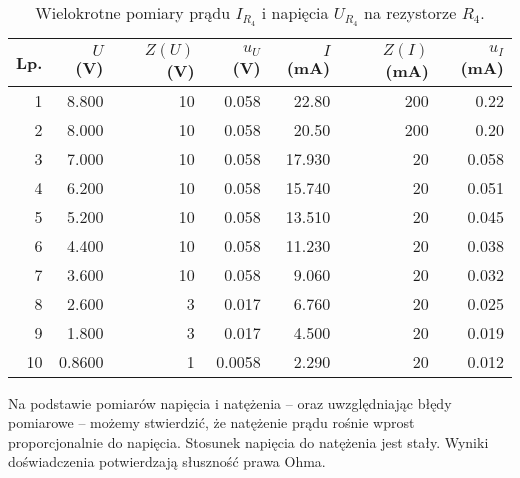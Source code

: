\documentclass[a4paper]{article}
\newlength{\du}
\begin{document}
\begin{table}
\centering
\begin{tabular}{rrrrrrr}
\toprule
Lp. &  $U$ (V) &  $Z(U)$ (V) &  $u_U$ (V) &  $I$ (mA) &  $Z(I)$ (mA) &  $u_I$ (mA) \\
\midrule
1 &          8.800  &                10 &                 0.058  &             22.80  &                200 &                     0.22 \\
2 &          8.000  &                10 &                 0.058  &             20.50  &                200 &                     0.20 \\
3 &          7.000  &                10 &                 0.058  &             17.930 &                 20 &                     0.058 \\
4 &          6.200  &                10 &                 0.058  &             15.740 &                 20 &                     0.051 \\
5 &          5.200  &                10 &                 0.058  &             13.510 &                 20 &                     0.045 \\
6 &          4.400  &                10 &                 0.058  &             11.230 &                 20 &                     0.038 \\
7 &          3.600  &                10 &                 0.058  &              9.060 &                 20 &                     0.032 \\
8 &          2.600  &                 3 &                 0.017  &              6.760 &                 20 &                     0.025 \\
9 &          1.800  &                 3 &                 0.017  &              4.500 &                 20 &                     0.019 \\
10 &         0.8600 &                 1 &                 0.0058 &              2.290 &                 20 &                     0.012 \\
\bottomrule
\end{tabular}
\caption{Wielokrotne pomiary prądu $I_{R_4}$ i napięcia $U_{R_4}$ na rezystorze $R_4$.}
\label{pomiary_r4}
\end{table}

Na podstawie pomiarów napięcia i natężenia -- oraz uwzględniając błędy pomiarowe -- możemy stwierdzić, że natężenie prądu rośnie wprost proporcjonalnie do napięcia.
Stosunek napięcia do natężenia jest stały.
Wyniki doświadczenia potwierdzają słuszność prawa Ohma.
\end{document}
